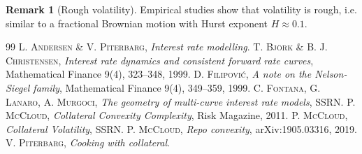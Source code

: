 \documentclass[11pt,english]{amsart}
\theoremstyle{definition}
\newtheorem{rema}{Remark}
\begin{document}
\begin{rema}[Rough volatility]
Empirical studies show that volatility is rough, i.e. similar to a fractional Brownian motion with Hurst exponent $H \approx 0.1$. 
\end{rema}


\newpage%
\begin{thebibliography}{99}
%
\textsc{L. Andersen \& V. Piterbarg,}
\textit{Interest rate modelling}.
%
\textsc{T. Bj\"ork \& B. J. Christensen,}
\textit{Interest rate dynamics and consistent forward rate curves},
Mathematical Finance 9(4), 323--348, 1999.
%
\textsc{D. Filipovi\'c,}
\textit{A note on the Nelson-Siegel family},
Mathematical Finance 9(4), 349--359, 1999.
%
\textsc{C. Fontana, G. Lanaro, A. Murgoci,}
\textit{The geometry of multi-curve interest rate models},
SSRN.
%
\textsc{P. McCloud,}
\textit{Collateral Convexity Complexity},
Risk Magazine, 2011.
%
\textsc{P. McCloud,}
\textit{Collateral Volatility},
SSRN.
%
\textsc{P. McCloud,}
\textit{Repo convexity},
arXiv:1905.03316, 2019.
%
\textsc{V. Piterbarg,}
\textit{Cooking with collateral}.
%
\end{thebibliography}
\end{document}
